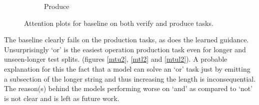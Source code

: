 \begin{figure}[ht]
\begin{subfigure}[b]{0.5\linewidth}
		\caption{Produce} 
		\label{base-prod} 
		\vspace{2ex}
	\end{subfigure}
	\caption{Attention plots for baseline on both verify and produce tasks. }
	\label{base-attn}
\end{figure}
The baseline clearly fails on the production tasks, as does the learned guidance. Unsurprisingly \lq or\rq{} is the easiest operation production task even for longer and unseen-longer test splits. (figures \ref{mtu2}, \ref{mtl2} and \ref{mtul2}). A probable explanation for this the fact that a model can solve an \lq or\rq{} task just by emitting a subsection of the longer string and thus increasing the length is inconsequential. The reason(s) behind the models performing worse on \lq and\rq{} as compared to \lq not\rq{} is not clear and is left as future work.

